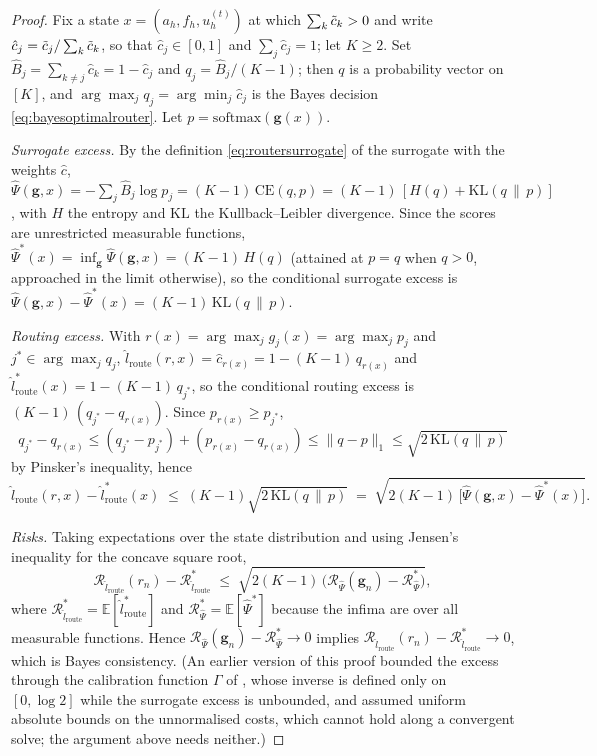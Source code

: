 \documentclass{article}
\newcommand{\edit}[1]{{\color{red}#1}}
\begin{document}
\begin{proof}
\edit{Fix a state $x = (a_h, f_h, u^{(t)}_h)$ at which $\sum_k \Tilde{c}_k > 0$ and write $\hat c_j = \Tilde{c}_j/\sum_k \Tilde{c}_k$, so that $\hat c_j \in [0,1]$ and $\sum_j \hat c_j = 1$; let $K \ge 2$. Set $\hat B_j = \sum_{k \ne j} \hat c_k = 1 - \hat c_j$ and $q_j = \hat B_j/(K-1)$; then $q$ is a probability vector on $[K]$, and $\arg\max_j q_j = \arg\min_j \hat c_j$ is the Bayes decision \eqref{eq:bayesoptimalrouter}. Let $p = \mathrm{softmax}(\mathbf g(x))$.

\emph{Surrogate excess.} By the definition \eqref{eq:routersurrogate} of the surrogate with the weights $\hat c$, $\hat\Psi(\mathbf g, x) = -\sum_j \hat B_j \log p_j = (K-1)\,\mathrm{CE}(q, p) = (K-1)\,[H(q) + \mathrm{KL}(q\,\|\,p)]$, with $H$ the entropy and $\mathrm{KL}$ the Kullback--Leibler divergence. Since the scores are unrestricted measurable functions, $\hat\Psi^*(x) = \inf_{\mathbf g} \hat\Psi(\mathbf g, x) = (K-1)\,H(q)$ (attained at $p = q$ when $q > 0$, approached in the limit otherwise), so the conditional surrogate excess is $\hat\Psi(\mathbf g, x) - \hat\Psi^*(x) = (K-1)\,\mathrm{KL}(q\,\|\,p)$.

\emph{Routing excess.} With $r(x) = \arg\max_j g_j(x) = \arg\max_j p_j$ and $j^* \in \arg\max_j q_j$, $\hat l_{\text{route}}(r, x) = \hat c_{r(x)} = 1 - (K-1)\,q_{r(x)}$ and $\hat l^*_{\text{route}}(x) = 1 - (K-1)\,q_{j^*}$, so the conditional routing excess is $(K-1)\,(q_{j^*} - q_{r(x)})$. Since $p_{r(x)} \ge p_{j^*}$,
\begin{equation*}
    q_{j^*} - q_{r(x)} \le (q_{j^*} - p_{j^*}) + (p_{r(x)} - q_{r(x)}) \le \|q - p\|_1 \le \sqrt{2\,\mathrm{KL}(q\,\|\,p)}
\end{equation*}
by Pinsker's inequality, hence
\begin{equation*}
    \hat l_{\text{route}}(r, x) - \hat l^*_{\text{route}}(x) \;\le\; (K-1)\sqrt{2\,\mathrm{KL}(q\,\|\,p)} \;=\; \sqrt{2(K-1)\,\big[\hat\Psi(\mathbf g, x) - \hat\Psi^*(x)\big]}.
\end{equation*}

\emph{Risks.} Taking expectations over the state distribution and using Jensen's inequality for the concave square root,
\begin{equation*}
    \mathcal R_{\hat l_{\text{route}}}(r_n) - \mathcal R^*_{\hat l_{\text{route}}} \;\le\; \sqrt{2(K-1)\,\big(\mathcal R_{\hat\Psi}(\mathbf g_n) - \mathcal R^*_{\hat\Psi}\big)},
\end{equation*}
where $\mathcal R^*_{\hat l_{\text{route}}} = \mathbb E[\hat l^*_{\text{route}}]$ and $\mathcal R^*_{\hat\Psi} = \mathbb E[\hat\Psi^*]$ because the infima are over all measurable functions. Hence $\mathcal R_{\hat\Psi}(\mathbf g_n) - \mathcal R^*_{\hat\Psi} \to 0$ implies $\mathcal R_{\hat l_{\text{route}}}(r_n) - \mathcal R^*_{\hat l_{\text{route}}} \to 0$, which is Bayes consistency. (An earlier version of this proof bounded the excess through the calibration function $\Gamma$ of \citet{mao2023cross}, whose inverse is defined only on $[0, \log 2]$ while the surrogate excess is unbounded, and assumed uniform absolute bounds on the unnormalised costs, which cannot hold along a convergent solve; the argument above needs neither.)}
\end{proof}
\end{document}

